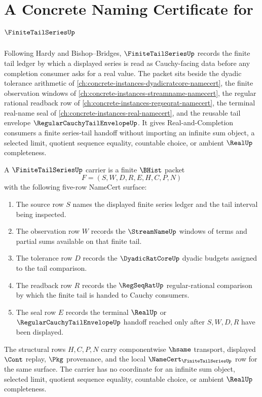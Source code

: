 \chapter{A Concrete Naming Certificate for $\FiniteTailSeriesUp$}
\label{ch:concrete-instances-finite-tail-series-namecert}

Following Hardy and Bishop--Bridges, $\FiniteTailSeriesUp$ records the finite tail ledger by which a displayed series is read as Cauchy-facing data before any completion consumer asks for a real value. The packet sits beside the dyadic tolerance arithmetic of \autoref{ch:concrete-instances-dyadicratcore-namecert}, the finite observation windows of \autoref{ch:concrete-instances-streamname-namecert}, the regular rational readback row of \autoref{ch:concrete-instances-regseqrat-namecert}, the terminal real-name seal of \autoref{ch:concrete-instances-real-namecert}, and the reusable tail envelope $\RegularCauchyTailEnvelopeUp$. It gives Real-and-Completion consumers a finite series-tail handoff without importing an infinite sum object, a selected limit, quotient sequence equality, countable choice, or ambient $\RealUp$ completeness.

\begin{definition}
\label{def:finite-tail-series-carrier}
A $\FiniteTailSeriesUp$ carrier is a finite $\BHist$ packet
$$
F=(S,W,D,R,E,H,C,P,N)
$$
with the following five-row NameCert surface:
\begin{enumerate}
\item The source row $S$ names the displayed finite series ledger and the tail interval being inspected.
\item The observation row $W$ records the $\StreamNameUp$ windows of terms and partial sums available on that finite tail.
\item The tolerance row $D$ records the $\DyadicRatCoreUp$ dyadic budgets assigned to the tail comparison.
\item The readback row $R$ records the $\RegSeqRatUp$ regular-rational comparison by which the finite tail is handed to Cauchy consumers.
\item The seal row $E$ records the terminal $\RealUp$ or $\RegularCauchyTailEnvelopeUp$ handoff reached only after $S,W,D,R$ have been displayed.
\end{enumerate}
The structural rows $H,C,P,N$ carry componentwise $\hsame$ transport, displayed $\Cont$ replay, $\Pkg$ provenance, and the local $\NameCert_{\FiniteTailSeriesUp}$ row for the same surface. The carrier has no coordinate for an infinite sum object, selected limit, quotient sequence equality, countable choice, or ambient $\RealUp$ completeness.
\end{definition}

